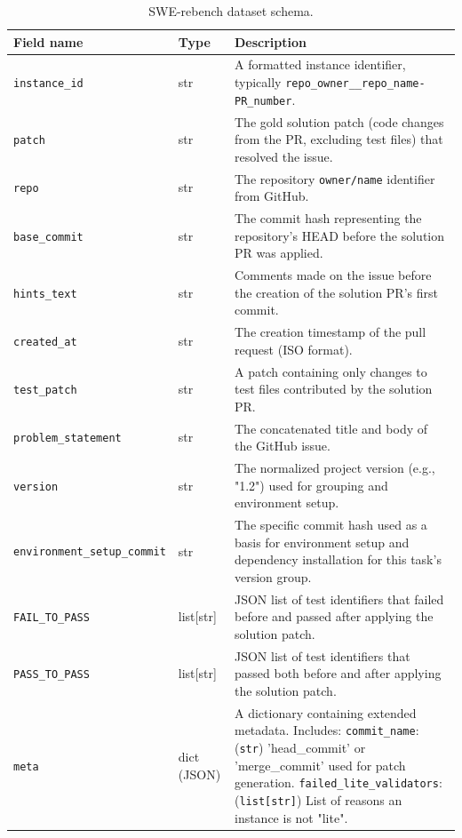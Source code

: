 \documentclass[dandb]{article}
\begin{document}
\begin{table}[htbp]
  \centering
  \caption{SWE-rebench dataset schema.}
  \label{tab:dataset_fields}
  \begin{tabularx}{\textwidth}{@{}llX@{}}
    \toprule
    Field name & Type & Description \\
    \midrule
    \texttt{instance\_id} & str & A formatted instance identifier, typically \texttt{repo\_owner\_\_repo\_name-PR\_number}. \\
    \texttt{patch} & str & The gold solution patch (code changes from the PR, excluding test files) that resolved the issue. \\
    \texttt{repo} & str & The repository \texttt{owner/name} identifier from GitHub. \\
    \texttt{base\_commit} & str & The commit hash representing the repository's HEAD before the solution PR was applied. \\
    \texttt{hints\_text} & str & Comments made on the issue before the creation of the solution PR’s first commit. \\
    \texttt{created\_at} & str & The creation timestamp of the pull request (ISO format). \\
    \texttt{test\_patch} & str & A patch containing only changes to test files contributed by the solution PR. \\
    \texttt{problem\_statement} & str & The concatenated title and body of the GitHub issue. \\
    \texttt{version} & str & The normalized project version (e.g., "1.2") used for grouping and environment setup. \\
    \texttt{environment\_setup\_commit} & str & The specific commit hash used as a basis for environment setup and dependency installation for this task's version group. \\
    \texttt{FAIL\_TO\_PASS} & list[str] & JSON list of test identifiers that failed before and passed after applying the solution patch. \\
    \texttt{PASS\_TO\_PASS} & list[str] & JSON list of test identifiers that passed both before and after applying the solution patch. \\
    \texttt{meta} & dict (JSON) & A dictionary containing extended metadata. Includes: \newline 
        \quad \texttt{commit\_name}: (\texttt{str}) 'head\_commit' or 'merge\_commit' used for patch generation. \newline
        \quad \texttt{failed\_lite\_validators}: (\texttt{list[str]}) List of reasons an instance is not "lite". \newline

\end{tabularx}
\end{table}
\end{document}
